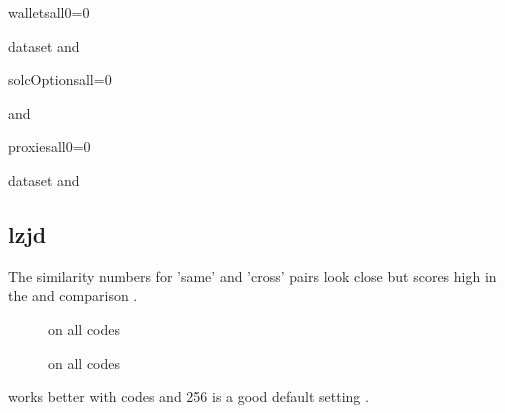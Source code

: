 \documentclass[../main.tex]{subfiles}
\begin{document}
\begin{sepTbl}{wallets}{all}{0=0}
  \caption{ dataset  and }
  \label{tbl:wallet_sep}
\end{sepTbl}

\begin{sepTbl}{solcOptions}{all}{=0}
  \caption{\n{\solcts}  and }
  \label{tbl:solc_sep}
\end{sepTbl}

\begin{sepTbl}{proxies}{all}{0=0}
  \caption{ dataset  and }
  \label{tbl:proxies_sep}
\end{sepTbl}

\subsection{lzjd}

\begin{hyp}
  The similarity numbers for 'same' and 'cross' pairs look close  but  scores high in the  and  comparison .
\end{hyp}

\begin{figure}[ht!]
  \centering
  \caption{ on all  \n{\solcts} codes}
  \label{fig:solc_lzjd1}
\end{figure}

\begin{figure}[ht!]
  \centering
  \caption{ on all  \n{\solcts} codes}
  \label{fig:solc_lzjd2}
\end{figure}

\begin{hyp}
   works better with  codes and 256 is a good default  setting .
\end{hyp}
\end{document}
